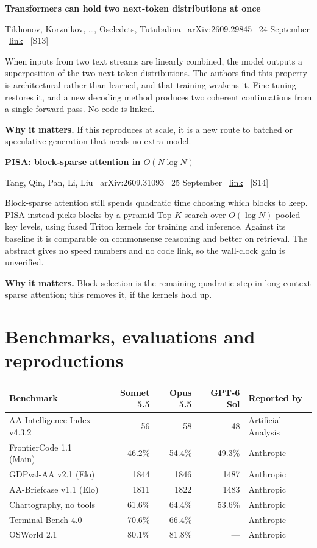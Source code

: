 \documentclass[11pt,a4paper]{article}
\newcommand{\entry}[4]{%
  \par\vspace{0.7em}%
  {\sffamily\bfseries\color{brandink}#1}\par
  {\footnotesize\color{brandgrey}#2 \textbullet\ \href{#3}{link} \textbullet\ \srcref{#4}}\par
  \vspace{0.15em}}
\newcommand{\why}[1]{\par{\small\textbf{Why it matters.} #1}\par}
\newcommand{\srcref}[1]{\textcolor{brandaccent}{[S#1]}}
\begin{document}
\entry{Transformers can hold two next-token distributions at once}{Tikhonov, Korznikov, \ldots, Oseledets, Tutubalina \textbullet\ arXiv:2609.29845 \textbullet\ 24 September}{https://arxiv.org/abs/2609.29845}{13}
When inputs from two text streams are linearly combined, the model outputs a superposition
of the two next-token distributions. The authors find this property is architectural rather
than learned, and that training weakens it. Fine-tuning restores it, and a new decoding
method produces two coherent continuations from a single forward pass. No code is linked.
\why{If this reproduces at scale, it is a new route to batched or speculative generation that needs no extra model.}

\entry{PISA: block-sparse attention in \texorpdfstring{$O(N\log N)$}{O(N log N)}}{Tang, Qin, Pan, Li, Liu \textbullet\ arXiv:2609.31093 \textbullet\ 25 September}{https://arxiv.org/abs/2609.31093}{14}
Block-sparse attention still spends quadratic time choosing which blocks to keep. PISA
instead picks blocks by a pyramid Top-$K$ search over $O(\log N)$ pooled key levels, using
fused Triton kernels for training and inference. Against its baseline it is comparable
on commonsense reasoning and better on retrieval. The abstract gives no speed numbers
and no code link, so the wall-clock gain is unverified.
\why{Block selection is the remaining quadratic step in long-context sparse attention; this removes it, if the kernels hold up.}

\section{Benchmarks, evaluations and reproductions}

{\small
\begin{tabularx}{\textwidth}{@{}X r r r l@{}}
\toprule
\textbf{Benchmark} & \textbf{Sonnet 5.5} & \textbf{Opus 5.5} & \textbf{GPT-6 Sol} & \textbf{Reported by} \\
\midrule
AA Intelligence Index v4.3.2 & 56 & 58 & 48 & Artificial Analysis \\
FrontierCode 1.1 (Main)      & 46.2\% & 54.4\% & 49.3\% & Anthropic \\
GDPval-AA v2.1 (Elo)         & 1844 & 1846 & 1487 & Anthropic \\
AA-Briefcase v1.1 (Elo)      & 1811 & 1822 & 1483 & Anthropic \\
Chartography, no tools       & 61.6\% & 64.4\% & 53.6\% & Anthropic \\
Terminal-Bench 4.0           & 70.6\% & 66.4\% & --- & Anthropic \\
OSWorld 2.1                  & 80.1\% & 81.8\% & --- & Anthropic \\
\bottomrule
\end{tabularx}}
\vspace{0.3em}
\end{document}
